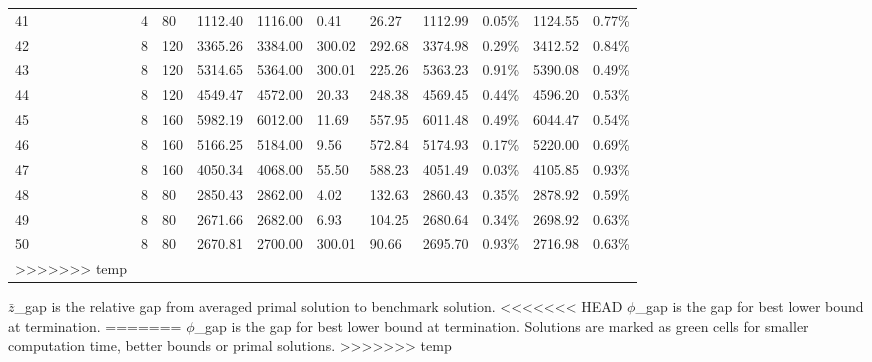 \documentclass[../main]{subfiles}
\begin{document}
\begin{longtable}{l|ll|lll|lllll}
   41                  & 4                               & 80                     & 1112.40             & 1116.00  & 0.41          & 26.27                      & \cellcolor{green!25}1112.99 & 0.05\%  & 1124.55 & 0.77\% \\
   42                  & 8                               & 120                    & 3365.26             & 3384.00  & 300.02        & \cellcolor{green!25}292.68 & \cellcolor{green!25}3374.98 & 0.29\%  & 3412.52 & 0.84\% \\
   43                  & 8                               & 120                    & 5314.65             & 5364.00  & 300.01        & \cellcolor{green!25}225.26 & \cellcolor{green!25}5363.23 & 0.91\%  & 5390.08 & 0.49\% \\
   44                  & 8                               & 120                    & 4549.47             & 4572.00  & 20.33         & 248.38                     & \cellcolor{green!25}4569.45 & 0.44\%  & 4596.20 & 0.53\% \\
   45                  & 8                               & 160                    & 5982.19             & 6012.00  & 11.69         & 557.95                     & \cellcolor{green!25}6011.48 & 0.49\%  & 6044.47 & 0.54\% \\
   46                  & 8                               & 160                    & 5166.25             & 5184.00  & 9.56          & 572.84                     & \cellcolor{green!25}5174.93 & 0.17\%  & 5220.00 & 0.69\% \\
   47                  & 8                               & 160                    & 4050.34             & 4068.00  & 55.50         & 588.23                     & \cellcolor{green!25}4051.49 & 0.03\%  & 4105.85 & 0.93\% \\
   48                  & 8                               & 80                     & 2850.43             & 2862.00  & 4.02          & 132.63                     & \cellcolor{green!25}2860.43 & 0.35\%  & 2878.92 & 0.59\% \\
   49                  & 8                               & 80                     & 2671.66             & 2682.00  & 6.93          & 104.25                     & \cellcolor{green!25}2680.64 & 0.34\%  & 2698.92 & 0.63\% \\
   50                  & 8                               & 80                     & 2670.81             & 2700.00  & 300.01        & \cellcolor{green!25}90.66  & \cellcolor{green!25}2695.70 & 0.93\%  & 2716.98 & 0.63\% \\
>>>>>>> temp
   \bottomrule
\end{longtable}

\small
$\bar z$\_gap is the relative gap from averaged primal solution to benchmark solution.
<<<<<<< HEAD
$\phi$\_gap is the gap for best lower bound at termination.
=======
$\phi$\_gap is the gap for best lower bound at termination. Solutions are marked as green cells for smaller computation time, better bounds or primal solutions.
>>>>>>> temp

\normalsize
\end{document}

